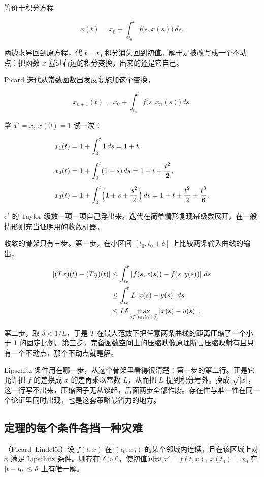 等价于积分方程

\[
x(t)=x_0+\int_{t_0}^{t}f\bigl(s,x(s)\bigr)\,ds.
\]

两边求导回到原方程，代 \(t=t_0\) 积分消失回到初值。解于是被改写成一个不动点：把函数 \(x\) 塞进右边的积分变换，出来的还是它自己。

Picard 迭代从常数函数出发反复施加这个变换，

\[
x_{n+1}(t)=x_0+\int_{t_0}^{t}f\bigl(s,x_n(s)\bigr)\,ds.
\]

拿 \(x'=x,\ x(0)=1\) 试一次：

\[
\begin{aligned}
x_1(t)&=1+\int_0^t 1\,ds=1+t,\\[2mm]
x_2(t)&=1+\int_0^t (1+s)\,ds=1+t+\frac{t^2}{2},\\[2mm]
x_3(t)&=1+\int_0^t \Bigl(1+s+\frac{s^2}{2}\Bigr)\,ds=1+t+\frac{t^2}{2}+\frac{t^3}{6}.
\end{aligned}
\]

\(e^t\) 的 Taylor 级数一项一项自己浮出来。迭代在简单情形复现幂级数展开，在一般情形则充当证明用的收敛机器。

收敛的骨架只有三步。第一步，在小区间 \([t_0,t_0+\delta]\) 上比较两条输入曲线的输出，

\[
\begin{aligned}
\left|(Tx)(t)-(Ty)(t)\right|
&\le\int_{t_0}^{t}\left|f(s,x(s))-f(s,y(s))\right|\,ds\\
&\le\int_{t_0}^{t}L\left|x(s)-y(s)\right|\,ds\\
&\le L\delta\max_{s\in[t_0,t_0+\delta]}\left|x(s)-y(s)\right|.
\end{aligned}
\]

第二步，取 \(\delta<1/L\)，于是 \(T\) 在最大范数下把任意两条曲线的距离压缩了一个小于 \(1\) 的固定比例。第三步，完备函数空间上的压缩映像原理断言压缩映射有且只有一个不动点，那个不动点就是解。

Lipschitz 条件用在哪一步，从这个骨架里看得很清楚：第一步的第二行。正是它允许把 \(f\) 的差换成 \(x\) 的差再乘以常数 \(L\)，从而把 \(L\) 提到积分号外。换成 \(\sqrt{\left|x\right|}\)，这一行写不出来，压缩因子无从谈起，后面两步全部作废。存在性与唯一性在同一个论证里同时出现，也是这套策略最省力的地方。

\subsection{定理的每个条件各挡一种灾难}

\begin{theorem}
（Picard--Lindelöf）设 \(f(t,x)\) 在 \((t_0,x_0)\) 的某个邻域内连续，且在该区域上对 \(x\) 满足 Lipschitz 条件。则存在 \(\delta>0\)，使初值问题 \(x'=f(t,x),\ x(t_0)=x_0\) 在 \(\left|t-t_0\right|\le\delta\) 上有唯一解。
\end{theorem}

